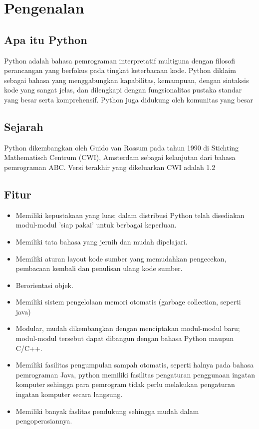 \setcounter{page}{1}
\section{Pengenalan}
\subsection{Apa itu Python}
Python adalah bahasa pemrograman interpretatif multiguna dengan filosofi perancangan yang berfokus pada tingkat keterbacaan kode. Python diklaim sebagai bahasa yang menggabungkan kapabilitas, kemampuan, dengan sintaksis kode yang sangat jelas, dan dilengkapi dengan fungsionalitas pustaka standar yang besar serta komprehensif. Python juga didukung oleh komunitas yang besar

\subsection{Sejarah}
Python dikembangkan oleh Guido van Rossum pada tahun 1990 di Stichting Mathematisch Centrum (CWI), Amsterdam sebagai kelanjutan dari bahasa pemrograman ABC. Versi terakhir yang dikeluarkan CWI adalah 1.2

\subsection{Fitur}

\begin{itemize}
    \item Memiliki kepustakaan yang luas; dalam distribusi Python telah disediakan modul-modul 'siap pakai' untuk berbagai keperluan.
    \item Memiliki tata bahasa yang jernih dan mudah dipelajari.
    \item Memiliki aturan layout kode sumber yang memudahkan pengecekan, pembacaan kembali dan penulisan ulang kode sumber.
    \item Berorientasi objek.
    \item Memiliki sistem pengelolaan memori otomatis (garbage collection, seperti java)
    \item Modular, mudah dikembangkan dengan menciptakan modul-modul baru; modul-modul tersebut dapat dibangun dengan bahasa Python maupun C/C++.
    \item Memiliki fasilitas pengumpulan sampah otomatis, seperti halnya pada bahasa pemrograman Java, python memiliki fasilitas pengaturan penggunaan ingatan komputer sehingga para pemrogram tidak perlu melakukan pengaturan ingatan komputer secara langsung.
    \item Memiliki banyak faslitas pendukung sehingga mudah dalam pengoperasiannya.
\end{itemize}

